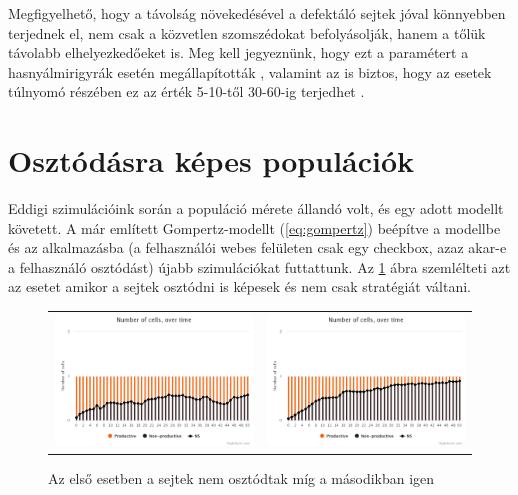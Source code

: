 Megfigyelhető, hogy a távolság növekedésével a defektáló sejtek jóval könnyebben terjednek el, nem csak a közvetlen szomszédokat befolyásolják, hanem a tőlük távolabb elhelyezkedőeket is. Meg kell jegyeznünk, hogy ezt a paramétert a hasnyálmirigyrák esetén megállapították \cite{archetti2015heterogeneity}, valamint az is biztos, hogy az esetek túlnyomó részében ez az érték 5-10-től 30-60-ig terjedhet \cite{archetti2016cooperation}.
\section{Osztódásra képes populációk}

Eddigi szimulációink során a populáció mérete állandó volt, és egy adott modellt követett. A már említett Gompertz-modellt (\ref{eq:gompertz}) beépítve a modellbe és az alkalmazásba (a felhasználói webes felületen csak egy checkbox, azaz akar-e a felhasználó osztódást) újabb szimulációkat futtattunk. Az \ref{fig:Divide} ábra szemlélteti azt az esetet amikor a sejtek osztódni is képesek és nem csak stratégiát váltani. 

\begin{figure}[ht!]
	\centering
	\begin{tabular}{cc}
		\includegraphics[width=0.47\linewidth]{images/nemosztodik}
		&
		\includegraphics[width=0.47\linewidth]{images/osztodik}
	\end{tabular}
	\caption{Az első esetben a sejtek nem osztódtak míg a másodikban igen}
	\label{fig:Divide}
\end{figure}

